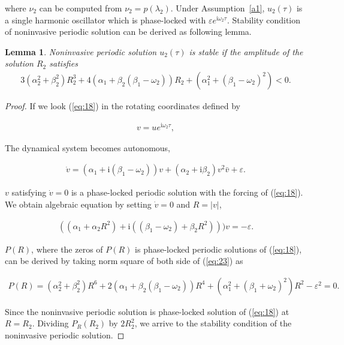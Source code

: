 \documentclass[openacc]{rsproca_new}%
\def\epsilon{\varepsilon}
\newcommand{\Eref}[1]{(\ref{#1})}
\newcommand{\asref}[1]{Assumption~\ref{#1}}
\newtheorem{lemma}{\bf Lemma}[section]
\begin{document}
\noindent where $\nu_2$ can be computed from $\nu_2=p(\lambda_2)$. Under \asref{a1}, $u_2(\tau)$ is a single harmonic oscillator which is phase-locked with $\epsilon e^{\textrm{i}\omega_2\tau}$. Stability condition of noninvasive periodic solution can be derived as following lemma.

\begin{lemma}\label{t1}
Noninvasive periodic solution $u_2(\tau)$ is stable if the amplitude of the solution $R_2$ satisfies
\begin{align}\label{eq:20}
3(\alpha_2^2+\beta_2^2)R_2^3+4(\alpha_1+\beta_2(\beta_1-\omega_2))R_2+(\alpha_1^2+(\beta_1-\omega_2)^2)<0.
\end{align}
\end{lemma}

\begin{proof}
If we look \Eref{eq:18} in the rotating coordinates defined by

\begin{align}\label{eq:21}
  v=ue^{\textrm{i}\omega_2 \tau},
\end{align}

\noindent The dynamical system becomes autonomous,

\begin{align}\label{eq:22}
  \dot v=(\alpha_1+\textrm{i}(\beta_1-\omega_2))v+(\alpha_2+\textrm{i}\beta_2)v^2\bar{v}+\epsilon.
\end{align}

\noindent $v$ satisfying $\dot v=0$ is a phase-locked periodic solution with the forcing of \Eref{eq:18}. We obtain algebraic equation by setting $\dot v=0$ and $R=|v|$,

\begin{align}\label{eq:23}
  ((\alpha_1+\alpha_2R^2)+\textrm{i}((\beta_1-\omega_2)+\beta_2 R^2)))v=-\epsilon.
\end{align}

\noindent $P(R)$, where the zeros of $P(R)$ is phase-locked periodic solutions of \Eref{eq:18}, can be derived by taking norm square of both side of \Eref{eq:23} as

\begin{align}\label{eq:24}
  P(R)=(\alpha_2^2+\beta_2^2)R^6+2(\alpha_1+\beta_2(\beta_1-\omega_2))R^4+(\alpha_1^2+(\beta_1+\omega_2)^2)R^2-\epsilon^2=0.
\end{align}

\noindent Since the noninvasive periodic solution is phase-locked solution of \Eref{eq:18} at $R=R_2$. Dividing $P_R(R_2)$ by $2R_2^2$, we arrive to the stability condition of the noninvasive periodic solution.
\end{proof}
\end{document}

